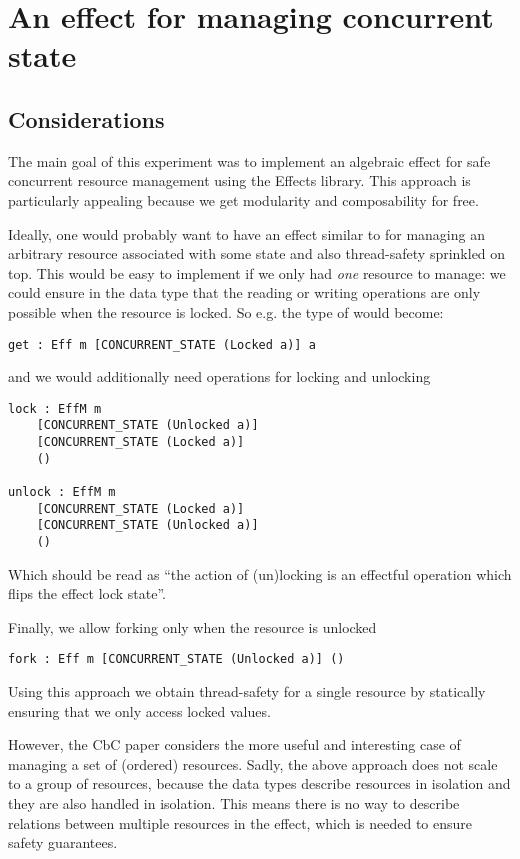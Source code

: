 \section{An effect for managing concurrent state}

\subsection{Considerations}

The main goal of this experiment was to implement an algebraic effect for safe
concurrent resource management using the Effects library. This approach is
particularly appealing because we get modularity and composability for free.

Ideally, one would probably want to have an effect similar to 
for managing an arbitrary resource associated with some state and also
thread-safety sprinkled on top. This would be easy to implement if we only had
\emph{one} resource to manage: we could ensure in the data type that the
reading or writing operations are only possible when the resource is locked. So
e.g. the type of  would become:

\begin{BVerbatim}
get : Eff m [CONCURRENT_STATE (Locked a)] a
\end{BVerbatim}

and we would additionally need operations for locking and unlocking

\begin{BVerbatim}
lock : EffM m
    [CONCURRENT_STATE (Unlocked a)]
    [CONCURRENT_STATE (Locked a)]
    ()

unlock : EffM m
    [CONCURRENT_STATE (Locked a)]
    [CONCURRENT_STATE (Unlocked a)]
    ()
\end{BVerbatim}

Which should be read as ``the action of (un)locking is an effectful operation
which flips the effect lock state''.

Finally, we allow forking only when the resource is unlocked

\begin{BVerbatim}
fork : Eff m [CONCURRENT_STATE (Unlocked a)] ()
\end{BVerbatim}

Using this approach we obtain thread-safety for a single resource by statically
ensuring that we only access locked values.

However, the CbC paper considers the more useful and interesting case of
managing a set of (ordered) resources. Sadly, the above approach does not scale
to a group of resources, because the data types describe resources in isolation
and they are also handled in isolation. This means there is no way to describe
relations between multiple resources in the effect, which is needed to ensure
safety guarantees.

